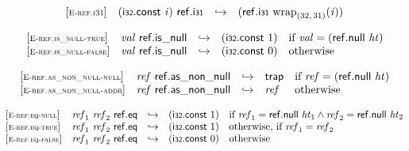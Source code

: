 $$
\begin{array}{@{}l@{}lcl@{}l@{}}
{[\textsc{\scriptsize E{-}ref.i31}]} \quad & (\mathsf{i{\scriptstyle32}}.\mathsf{const}~{\mathit{i}})~\mathsf{ref.i{\scriptstyle31}} &\hookrightarrow& (\mathsf{ref.i{\scriptstyle31}}~{{{\mathrm{wrap}}}_{(32,\, 31)}}{({\mathit{i}})}) &  \\
\end{array}
$$

\vspace{1ex}

$$
\begin{array}{@{}l@{}lcl@{}l@{}}
{[\textsc{\scriptsize E{-}ref.is\_null{-}true}]} \quad & {\mathit{val}}~\mathsf{ref.is\_null} &\hookrightarrow& (\mathsf{i{\scriptstyle32}}.\mathsf{const}~1) &\quad
  \mbox{if}~{\mathit{val}} = (\mathsf{ref.null}~{\mathit{ht}}) \\
{[\textsc{\scriptsize E{-}ref.is\_null{-}false}]} \quad & {\mathit{val}}~\mathsf{ref.is\_null} &\hookrightarrow& (\mathsf{i{\scriptstyle32}}.\mathsf{const}~0) &\quad
  \mbox{otherwise} \\
\end{array}
$$

\vspace{1ex}

$$
\begin{array}{@{}l@{}lcl@{}l@{}}
{[\textsc{\scriptsize E{-}ref.as\_non\_null{-}null}]} \quad & {\mathit{ref}}~\mathsf{ref.as\_non\_null} &\hookrightarrow& \mathsf{trap} &\quad
  \mbox{if}~{\mathit{ref}} = (\mathsf{ref.null}~{\mathit{ht}}) \\
{[\textsc{\scriptsize E{-}ref.as\_non\_null{-}addr}]} \quad & {\mathit{ref}}~\mathsf{ref.as\_non\_null} &\hookrightarrow& {\mathit{ref}} &\quad
  \mbox{otherwise} \\
\end{array}
$$

\vspace{1ex}

$$
\begin{array}{@{}l@{}lcl@{}l@{}}
{[\textsc{\scriptsize E{-}ref.eq{-}null}]} \quad & {\mathit{ref}}_{{1}}~{\mathit{ref}}_{{2}}~\mathsf{ref.eq} &\hookrightarrow& (\mathsf{i{\scriptstyle32}}.\mathsf{const}~1) &\quad
  \mbox{if}~{\mathit{ref}}_{{1}} = \mathsf{ref.null}~{\mathit{ht}}_{{1}} \land {\mathit{ref}}_{{2}} = \mathsf{ref.null}~{\mathit{ht}}_{{2}} \\
{[\textsc{\scriptsize E{-}ref.eq{-}true}]} \quad & {\mathit{ref}}_{{1}}~{\mathit{ref}}_{{2}}~\mathsf{ref.eq} &\hookrightarrow& (\mathsf{i{\scriptstyle32}}.\mathsf{const}~1) &\quad
  \mbox{otherwise, if}~{\mathit{ref}}_{{1}} = {\mathit{ref}}_{{2}} \\
{[\textsc{\scriptsize E{-}ref.eq{-}false}]} \quad & {\mathit{ref}}_{{1}}~{\mathit{ref}}_{{2}}~\mathsf{ref.eq} &\hookrightarrow& (\mathsf{i{\scriptstyle32}}.\mathsf{const}~0) &\quad
  \mbox{otherwise} \\
\end{array}
$$

